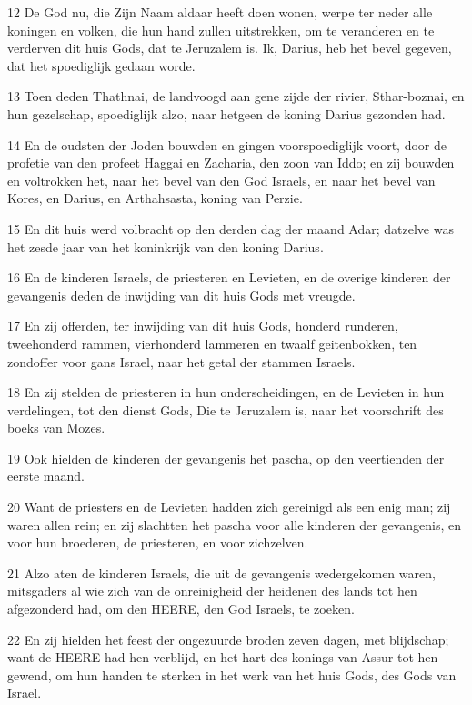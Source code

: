 \par 12 De God nu, die Zijn Naam aldaar heeft doen wonen, werpe ter neder alle koningen en volken, die hun hand zullen uitstrekken, om te veranderen en te verderven dit huis Gods, dat te Jeruzalem is. Ik, Darius, heb het bevel gegeven, dat het spoediglijk gedaan worde.
\par 13 Toen deden Thathnai, de landvoogd aan gene zijde der rivier, Sthar-boznai, en hun gezelschap, spoediglijk alzo, naar hetgeen de koning Darius gezonden had.
\par 14 En de oudsten der Joden bouwden en gingen voorspoediglijk voort, door de profetie van den profeet Haggai en Zacharia, den zoon van Iddo; en zij bouwden en voltrokken het, naar het bevel van den God Israels, en naar het bevel van Kores, en Darius, en Arthahsasta, koning van Perzie.
\par 15 En dit huis werd volbracht op den derden dag der maand Adar; datzelve was het zesde jaar van het koninkrijk van den koning Darius.
\par 16 En de kinderen Israels, de priesteren en Levieten, en de overige kinderen der gevangenis deden de inwijding van dit huis Gods met vreugde.
\par 17 En zij offerden, ter inwijding van dit huis Gods, honderd runderen, tweehonderd rammen, vierhonderd lammeren en twaalf geitenbokken, ten zondoffer voor gans Israel, naar het getal der stammen Israels.
\par 18 En zij stelden de priesteren in hun onderscheidingen, en de Levieten in hun verdelingen, tot den dienst Gods, Die te Jeruzalem is, naar het voorschrift des boeks van Mozes.
\par 19 Ook hielden de kinderen der gevangenis het pascha, op den veertienden der eerste maand.
\par 20 Want de priesters en de Levieten hadden zich gereinigd als een enig man; zij waren allen rein; en zij slachtten het pascha voor alle kinderen der gevangenis, en voor hun broederen, de priesteren, en voor zichzelven.
\par 21 Alzo aten de kinderen Israels, die uit de gevangenis wedergekomen waren, mitsgaders al wie zich van de onreinigheid der heidenen des lands tot hen afgezonderd had, om den HEERE, den God Israels, te zoeken.
\par 22 En zij hielden het feest der ongezuurde broden zeven dagen, met blijdschap; want de HEERE had hen verblijd, en het hart des konings van Assur tot hen gewend, om hun handen te sterken in het werk van het huis Gods, des Gods van Israel.

